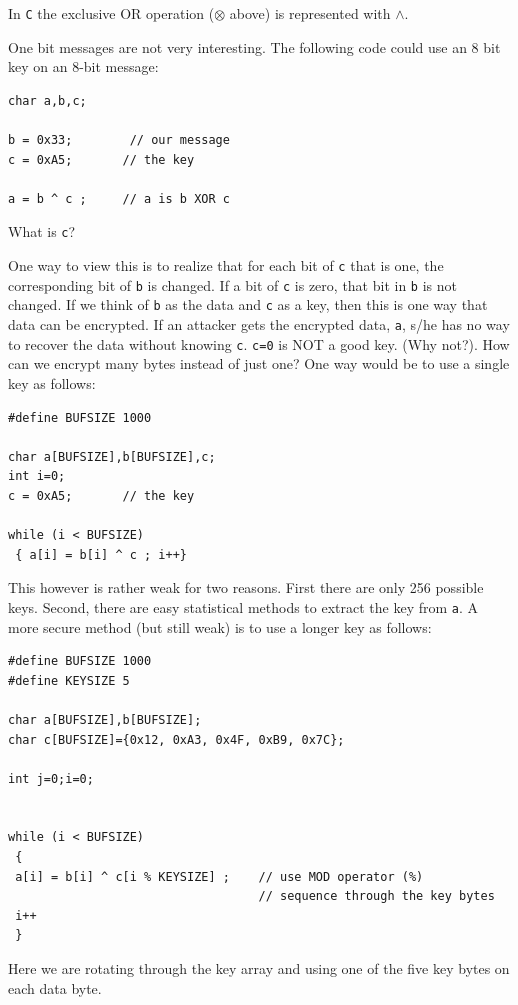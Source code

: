 \documentclass{article}	%
\begin{document}
In {\tt C} the exclusive OR operation ($\otimes$ above) is represented with $\wedge$.

One bit messages are not very interesting.   The following code could use an 8 bit key on
an 8-bit message:
\begin{verbatim}
char a,b,c;

b = 0x33;        // our message
c = 0xA5;       // the key

a = b ^ c ;     // a is b XOR c
\end{verbatim}
What is {\tt c}?

One way to view this is to realize that for each bit of {\tt c} that is one, the
corresponding bit of {\tt b} is changed.  If a bit of {\tt c} is zero,  that bit
in {\tt b} is not changed.   If we think of {\tt b} as the data and {\tt c} as a
 key, then this is one way that data can be encrypted.  If an attacker gets the
encrypted data, {\tt a}, s/he has no way to recover the data without knowing
{\tt c}.   {\tt c=0} is NOT a good key. (Why not?). How can we encrypt many
bytes instead of just one? One way would be to use a single key as follows:


\begin{verbatim}
#define BUFSIZE 1000

char a[BUFSIZE],b[BUFSIZE],c;
int i=0;
c = 0xA5;       // the key

while (i < BUFSIZE)
 { a[i] = b[i] ^ c ; i++}
\end{verbatim}
This however is rather weak for two reasons.  First there are
only 256 possible keys. Second, there are easy statistical methods
to extract the key from {\tt a}.   A more secure method (but still
 weak)
is to use a longer key as follows:


\begin{verbatim}
#define BUFSIZE 1000
#define KEYSIZE 5

char a[BUFSIZE],b[BUFSIZE];
char c[BUFSIZE]={0x12, 0xA3, 0x4F, 0xB9, 0x7C};

int j=0;i=0;


while (i < BUFSIZE)
 {
 a[i] = b[i] ^ c[i % KEYSIZE] ;    // use MOD operator (%)
                                   // sequence through the key bytes
 i++
 }
\end{verbatim}
Here we are rotating through the key array and using one of the five
 key bytes on each data byte.


\end{document}
